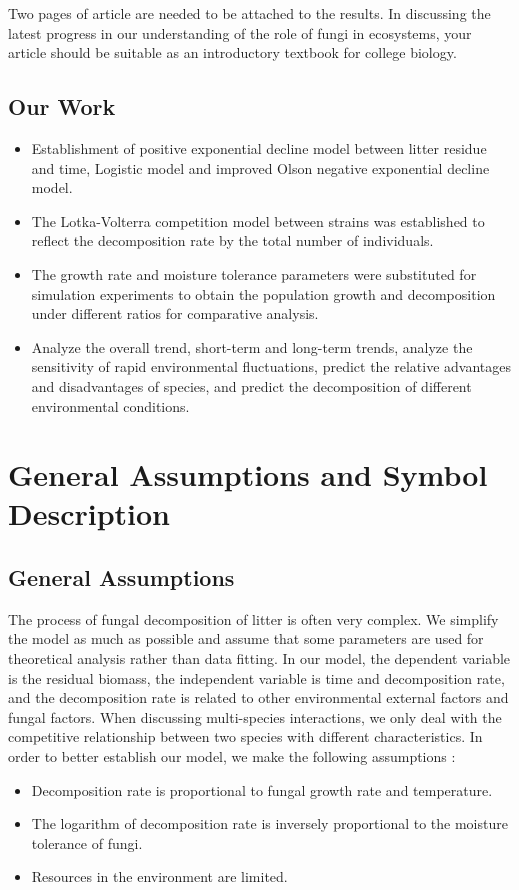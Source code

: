 \documentclass{mcmthesis}
\begin{document}
Two pages of article are needed to be attached to the results. In discussing the latest progress in our understanding of the role of fungi in ecosystems, your article should be suitable as an introductory textbook for college biology.
\subsection{Our Work}
\begin{itemize}
\item Establishment of positive exponential decline model between litter residue and time, Logistic model and improved Olson negative exponential decline model.

\item The Lotka-Volterra competition model between strains was established to reflect the decomposition rate by the total number of individuals.

\item The growth rate and moisture tolerance parameters were substituted for simulation experiments to obtain the population growth and decomposition under different ratios for comparative analysis.

\item Analyze the overall trend, short-term and long-term trends, analyze the sensitivity of rapid environmental fluctuations, predict the relative advantages and disadvantages of species, and predict the decomposition of different environmental conditions.
\end{itemize}
\section{General Assumptions and Symbol Description}
\subsection{General Assumptions}
The process of fungal decomposition of litter is often very complex. We simplify the model as much as possible and assume that some parameters are used for theoretical analysis rather than data fitting. In our model, the dependent variable is the residual biomass, the independent variable is time and decomposition rate, and the decomposition rate is related to other environmental external factors and fungal factors. When discussing multi-species interactions, we only deal with the competitive relationship between two species with different characteristics. In order to better establish our model, we make the following assumptions :
\begin{itemize}
\item Decomposition rate is proportional to fungal growth rate and temperature.

\item The logarithm of decomposition rate is inversely proportional to the moisture tolerance of fungi.

\item Resources in the environment are limited.
\end{itemize}
\end{document}
